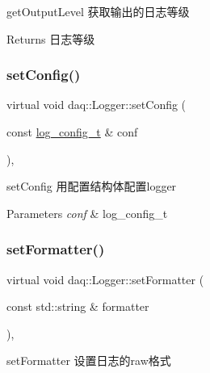 get\+Output\+Level 获取输出的日志等级 

\begin{DoxyReturn}{Returns}
日志等级 
\end{DoxyReturn}
\mbox{\label{classdaq_1_1Logger_aaec0b6a70d3e3e64704f38464a86b789}} 
\subsubsection{\texorpdfstring{set\+Config()}{setConfig()}}
{\footnotesize\ttfamily virtual void daq\+::\+Logger\+::set\+Config (\begin{DoxyParamCaption}\item[{const \hyperlink{structdaq_1_1LogConfigStruct}{log\+\_\+config\+\_\+t} \&}]{conf }\end{DoxyParamCaption})\hspace{0.3cm}{\ttfamily [inline]}, {\ttfamily [virtual]}}



set\+Config 用配置结构体配置logger 


\begin{DoxyParams}{Parameters}
{\em conf} & log\+\_\+config\+\_\+t \\
\hline
\end{DoxyParams}
\mbox{\label{classdaq_1_1Logger_a0d75dceef7a9633572760853ae19afdc}} 
\subsubsection{\texorpdfstring{set\+Formatter()}{setFormatter()}\hspace{0.1cm}{\footnotesize\ttfamily [1/2]}}
{\footnotesize\ttfamily virtual void daq\+::\+Logger\+::set\+Formatter (\begin{DoxyParamCaption}\item[{const std\+::string \&}]{formatter }\end{DoxyParamCaption})\hspace{0.3cm}{\ttfamily [inline]}, {\ttfamily [virtual]}}



set\+Formatter 设置日志的raw格式 


